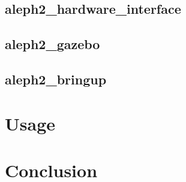 \documentclass[english,inz,shortabstract]{iithesis}
\begin{document}
\section{aleph2\_hardware\_interface}

\section{aleph2\_gazebo}

\section{aleph2\_bringup}

\chapter{Usage}

\chapter{Conclusion}



\end{document}
